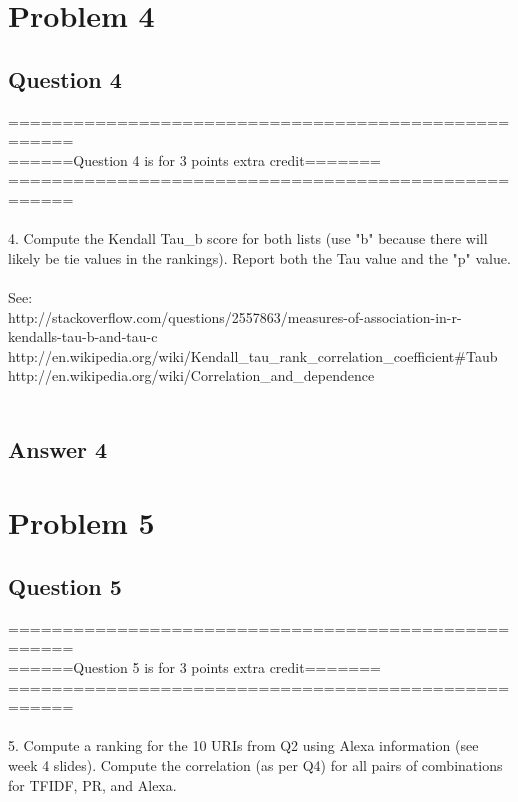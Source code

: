 \documentclass[10pt,letterpaper]{article}
\begin{document}
\pagebreak
\section{Problem 4}
\subsection{Question 4}
====================================================\\
======Question 4 is for 3 points extra credit=======\\
====================================================\\
\\
4.  Compute the Kendall Tau\_b score for both lists (use "b" because
there will likely be tie values in the rankings).  Report both the
Tau value and the "p" value.\\
\\
See:\\ 
http://stackoverflow.com/questions/2557863/measures-of-association-in-r-kendalls-tau-b-and-tau-c\\
http://en.wikipedia.org/wiki/Kendall\_tau\_rank\_correlation\_coefficient\#Tau\-b\\
http://en.wikipedia.org/wiki/Correlation\_and\_dependence\\
\\
\subsection{Answer 4}

\pagebreak
\section{Problem 5}
\subsection{Question 5}
====================================================\\
======Question 5 is for 3 points extra credit=======\\
====================================================\\
\\
5.  Compute a ranking for the 10 URIs from Q2 using Alexa information
(see week 4 slides).  Compute the correlation (as per Q4) for all
pairs of combinations for TFIDF, PR, and Alexa.\\
\\
\end{document}

